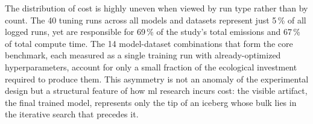 The distribution of cost is highly uneven when viewed by run type rather than by count. The 40 tuning runs across all models and datasets represent just 5\,\% of all logged runs, yet are responsible for 69\,\% of the study's total emissions and 67\,\% of total compute time. The 14 model-dataset combinations that form the core benchmark, each measured as a single training run with already-optimized hyperparameters, account for only a small fraction of the ecological investment required to produce them. This asymmetry is not an anomaly of the experimental design but a structural feature of how \gls{ml} research incurs cost: the visible artifact, the final trained model, represents only the tip of an iceberg whose bulk lies in the iterative search that precedes it.
